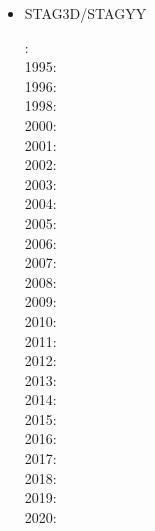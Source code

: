 \begin{itemize}
\item {\codefont STAG3D}/{\codefont STAGYY}  

{\small
{}: \cite{tackley94}\\
1995: \cite{scta95}\\
1996: \cite{tack96}\cite{tack96b}\\
1998: \cite{most98}\cite{thta98}\\
2000: \cite{tack00}\cite{tack00b}\cite{tack00c}\cite{tack00d}\\
2001: \cite{tack01}\\
2002: \cite{falt02}\cite{tack02}\cite{taxi02}\\
2003: \cite{taxi03}\\
2004: \cite{xita04b}\cite{xita04}\cite{nata04}\cite{nata04b}\cite{nata04c}\cite{scmo04}\\
2005: \cite{grlt05}\cite{fasa05}\cite{nata05}\cite{nata05b}\cite{nabu05}\\
2006: \cite{mita06}\\
2007: \cite{grlt07}\cite{grlt07b}\cite{heta07}\cite{tanh07}\\
2008: \cite{deta08}\cite{hets08}\cite{heta08}\cite{sata08}\cite{nata08}\cite{tack08}\cite{vata08}\\
2009: \cite{deta09}\cite{natd09}\cite{keta09}\\
2010: \cite{detn10}\cite{nata10}\cite{moht10}\cite{sate10}\cite{natd10}\\
2011: \cite{rota11}\cite{gokg11}\cite{nata11}\\
2012: \cite{roct12}\cite{crtm12}\cite{cosr13}\cite{deyt12}\cite{dect12}\cite{arta12}\cite{natd12}
      \cite{ullc12}\\
2013: \cite{ruts13}\cite{taab13}\cite{nata13}\cite{mowe13}\\
2014: \cite{yadl14}\cite{crta14}\cite{roct14}\cite{cort14}\cite{becr14}\cite{lidt14}\cite{robg14}
      \cite{nata14}\\
2015: \cite{bect15}\cite{delt15}\\
2016: \cite{sisc16}\cite{crta16}\\
2017: \cite{cogu17}\cite{pest17}\\
2018: \cite{cosh18}\cite{bofc18}\cite{cold18}\cite{arcf18}\cite{cram18}\cite{crli18}\cite{lalt18}\\
2019: \cite{gult19}\cite{argc19}\cite{deli19}\cite{pact19}\cite{cohf19}\cite{crcm19}\cite{ulcw19}\\
2020: \cite{lalt20}
}


\end{itemize}
